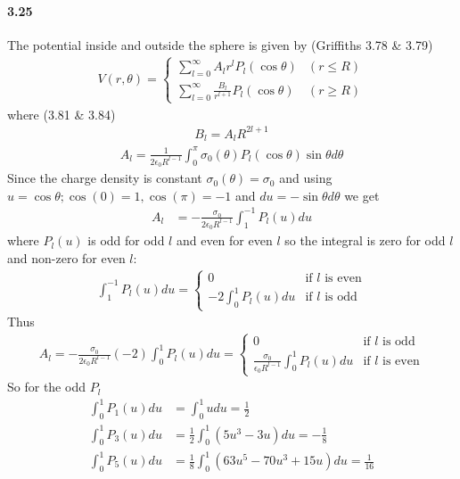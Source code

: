 \documentclass[../main.tex]{subfiles}
\begin{document}
\newpage
\paragraph{3.25} The potential inside and outside the sphere is given by (Griffiths 3.78 \& 3.79)
\begin{align*}
    V(r,\theta) = \begin{cases}
        \sum_{l=0}^\infty A_l r^l P_l(\cos\theta) & (r \leq R) \\
        \sum_{l=0}^\infty \frac{B_l}{r^{l+1}} P_l(\cos\theta) & (r \geq R)
    \end{cases}
\end{align*}
where (3.81 \& 3.84)
\begin{align*} \tag{3.81}
    B_l = A_l R^{2l + 1}
\end{align*}
\begin{align*} \tag{3.84}
    A_l = \frac{1}{2\epsilon_0 R^{l-1}} \int_0^\pi  \sigma_0(\theta) P_l (\cos\theta) \sin\theta d\theta
\end{align*}
Since the charge density is constant $\sigma_0(\theta) = \sigma_0$ and using $u = \cos\theta; \cos(0) = 1, \cos(\pi) = -1$ and $du = -\sin\theta d\theta$ we get
\begin{align*}
    A_l &= -\frac{\sigma_0}{2\epsilon_0 R^{l-1}} \int_1^{-1} P_l(u) du
\end{align*}
where $P_l(u)$ is odd for odd $l$ and even for even $l$ so the integral is zero for odd $l$ and non-zero for even $l$:
\begin{align*}
    \int_1^{-1} P_l(u) du = \begin{cases}
        0 & \text{if } l \text{ is even} \\
        -2 \int_0^1 P_l(u) du & \text{if } l \text{ is odd}
    \end{cases}
\end{align*}
Thus
\begin{align*}
    A_l = -\frac{\sigma_0}{2\epsilon_0 R^{l-1}} (-2)\int_0^1 P_l(u) du = \begin{cases}
        0 & \text{if } l \text{ is odd} \\
        \frac{\sigma_0}{\epsilon_0 R^{l-1}} \int_0^1 P_l(u) du & \text{if } l \text{ is even}
    \end{cases}
\end{align*}
So for the odd $P_l$
\begin{align*}
    \int_0^1 P_1(u) du &= \int_0^1 u du = \frac{1}{2} \\
    \int_0^1 P_3(u) du &= \frac{1}{2} \int_0^1 (5u^3 - 3u) du = -\frac{1}{8} \\
    \int_0^1 P_5(u) du &= \frac{1}{8} \int_0^1 (63u^5 - 70u^3 + 15u) du = \frac{1}{16}
\end{align*}
\end{document}
